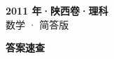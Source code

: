 \documentclass[zihao=-4, a4paper]{ctexart}
\begin{document}
\begin{center}
  {\Large\bfseries 2011 年·陕西卷·理科}\\[4pt]
  {\large 数学 · 简答版}
\end{center}
\medskip
{}

\clearpage
{}
\begin{center}{\Large\bfseries 答案速查}\end{center}
\medskip

\end{document}
